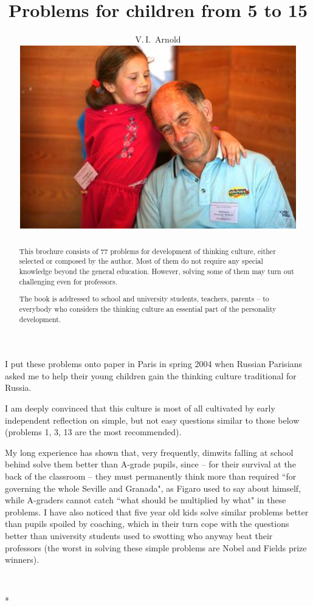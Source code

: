 \documentclass[12pt]{article}  %
\title{Problems for children from 5 to 15}
\author{V.\,I.~Arnold
\vspace*{2cm}\\ 
\includegraphics[width=12cm]{photo-arnold_small}
}
\date{}
\begin{document}
\def\eps{\varepsilon}
\maketitle
\thispagestyle{empty}

\newpage 
\setcounter{page}{1}
\begin{abstract}
This brochure consists of 77 problems for development of thinking culture, either selected or composed by the author.
Most of them do not require any special knowledge beyond the general education. However, solving some of them may
turn out challenging even for professors.

The book is addressed to school and university students, teachers, parents -- to everybody who considers the thinking culture 
an essential part of the personality development.
\end{abstract}

\newpage


I put these problems onto paper in Paris in spring 2004 when Russian Parisians asked me to help
their young children gain the thinking culture traditional for Russia.

I am deeply convinced that this culture is most of all cultivated by early independent reflection
on simple, but not easy questions similar to those below (problems 1, 3, 13 are the most recommended).

My long experience has shown that, very frequently, dimwits falling at school behind solve them better
than A-grade pupils, since -- for their survival at the back of the classroom -- they must permanently
think more than required ``for governing the whole Seville and Granada", as Figaro used to say about
himself, while A-graders cannot catch ``what should be multiplied by what" in these problems.
I have also noticed that five year old kids solve similar problems better than pupils spoiled
by coaching, which in their turn cope with the questions better than university students used
to swotting who anyway beat their professors (the worst in solving these simple problems are
Nobel and Fields prize winners).   

\ 

\vspace{0pt plus 12pt}
\centerline{*\quad *\quad*}
\vspace{.4\baselineskip}

\
\end{document}
